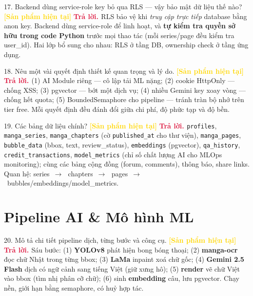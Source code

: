 \documentclass[11pt]{article}
\newcommand{\arr}{\,\ensuremath{\rightarrow}\,}
\newcommand{\tagSP}{\textcolor{gold}{\footnotesize\textbf{[Sản phẩm hiện tại]}}}
\newcommand{\A}{\textbf{\textcolor{crimson}{Trả lời. }}}
\begin{document}
\begin{qa}{17. Backend dùng service-role key bỏ qua RLS --- vậy bảo mật dữ liệu thế nào? \tagSP}
\A RLS bảo vệ khi \textit{truy cập trực tiếp} database bằng anon key. Backend dùng service-role để linh hoạt, và \textbf{tự kiểm tra quyền sở hữu trong code Python} trước mọi thao tác (mỗi series/page đều kiểm tra user\_id). Hai lớp bổ sung cho nhau: RLS ở tầng DB, ownership check ở tầng ứng dụng.
\end{qa}

\begin{qa}{18. Nêu một vài quyết định thiết kế quan trọng và lý do. \tagSP}
\A (1) AI Module riêng --- cô lập tải ML nặng; (2) cookie HttpOnly --- chống XSS; (3) pgvector --- bớt một dịch vụ; (4) nhiều Gemini key xoay vòng --- chống hết quota; (5) BoundedSemaphore cho pipeline --- tránh tràn bộ nhớ trên tier free. Mỗi quyết định đều đánh đổi giữa chi phí, độ phức tạp và độ bền.
\end{qa}

\begin{qa}{19. Các bảng dữ liệu chính? \tagSP}
\A \texttt{profiles}, \texttt{manga\_series}, \texttt{manga\_chapters} (cờ \texttt{published\_at} cho thư viện), \texttt{manga\_pages}, \texttt{bubble\_data} (bbox, text, review\_status), \texttt{embeddings} (pgvector), \texttt{qa\_history}, \texttt{credit\_transactions}, \texttt{model\_metrics} (chỉ số chất lượng AI cho MLOps monitoring); cùng các bảng cộng đồng (forum, comments), thông báo, share links. Quan hệ: series \arr\ chapters \arr\ pages \arr\ bubbles/embeddings/model\_metrics.
\end{qa}

\section{Pipeline AI \& Mô hình ML}

\begin{qa}{20. Mô tả chi tiết pipeline dịch, từng bước và công cụ. \tagSP}
\A Sáu bước: (1) \textbf{YOLOv8} phát hiện bong bóng thoại; (2) \textbf{manga-ocr} đọc chữ Nhật trong từng bbox; (3) \textbf{LaMa} inpaint xoá chữ gốc; (4) \textbf{Gemini 2.5 Flash} dịch có ngữ cảnh sang tiếng Việt (giữ xưng hô); (5) \textbf{render} vẽ chữ Việt vào bbox (tìm nhị phân cỡ chữ); (6) sinh \textbf{embedding} câu, lưu pgvector. Chạy nền, giới hạn bằng semaphore, có huỷ hợp tác.
\end{qa}
\end{document}
